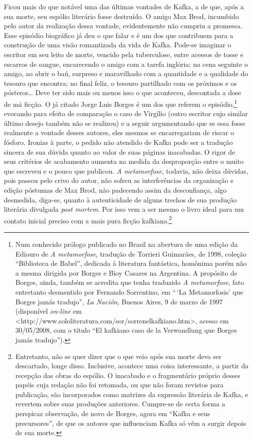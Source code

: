 Ficou mais do que notável uma das últimas vontades de Kafka, a de que,
após a sua morte, seu espólio literário fosse destruído. O amigo Max
Brod, incumbido pelo autor da realização dessa vontade, evidentemente
não cumpriu a promessa. Esse episódio biográfico já deu o que falar e é
um dos que contribuem para a construção de uma visão romantizada da vida de
Kafka. Pode-se imaginar o escritor em seu leito de morte, vencido
pela tuberculose, entre acessos de tosse e escarros de sangue,
encarecendo o amigo com a tarefa inglória; na cena seguinte o amigo, ao
abrir o baú, surpreso e maravilhado com a quantidade e a qualidade do
tesouro que encontra; no final feliz, o tesouro partilhado com os
próximos e os pósteros\ldots{} Deve ter sido mais ou menos isso o que
aconteceu, descontada a dose de má ficção. O já citado Jorge Luis
Borges é um dos que referem o episódio,\footnote{ Num conhecido prólogo
publicado no Brasil na abertura de uma edição da Ediouro de \textit{A
metamorfose}, tradução de Torrieri Guimarães, de 1998, coleção
“Biblioteca de Babel”, dedicada à literatura fantástica, homônima porém
não a mesma dirigida por Borges e Bioy Casares na Argentina. A
propósito de Borges, ainda, também se acredita que tenha traduzido
\textit{A metamorfose}, fato entretanto desmentido por Fernando
Sorrentino, em ``\,`La Metamorfosis’ que Borges jamás tradujo”, \textit{La
Nación}, Buenos Aires, 9 de marzo de 1997 (disponível \textit{on-line} em
<http://www.sololiteratura.com/sor/sorrenelkafkiano.htm>, acesso em
30/05/2008, com o título “El kafkiano caso de la Verwandlung que Borges
jamás tradujo”).} evocando para efeito de comparação o caso de Virgílio
(outro escritor cujo similar último desejo também não se realizou) e a
seguir argumentando que se essa fosse realmente a vontade desses
autores, eles mesmos se encarregariam de riscar o fósforo. Ironias à
parte, o pedido não atendido de Kafka pode ser a tradução sincera de
sua dúvida quanto ao valor de suas páginas inacabadas. O rigor de seus
critérios de acabamento aumenta na medida da desproporção entre o muito
que escreveu e o pouco que publicou. \textit{A metamorfose}, todavia,
não deixa dúvidas, pois passou pelo crivo do autor, não sofreu as
interferências da organização e edição póstumas de Max Brod, não
padecendo assim da desconfiança, algo desmedida, diga-se, quanto à
autenticidade de alguns trechos de sua produção literária divulgada
\textit{post mortem}. Por isso vem a ser mesmo o livro ideal para um
contato inicial preciso com a mais pura ficção kafkiana.\footnote{
Entretanto, não se quer dizer que o que veio após sua morte deva ser
descartado, longe disso. Inclusive, acontece uma coisa interessante, a
partir da recepção das obras do espólio. O inacabado e o fragmentário
próprio desses papéis cuja redação não foi retomada, ou que não foram
revistos para publicação, são incorporados como matrizes da expressão
literária de Kafka, e revertem sobre suas produções anteriores.
Cumpre-se de certa forma a perspicaz observação, de novo de Borges,
agora em “Kafka e seus precursores”, de que os autores que influenciam
Kafka só vêm a surgir depois de sua morte.}

